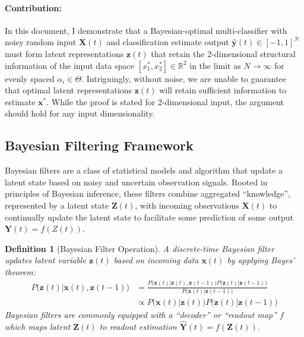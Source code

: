 \documentclass[12pt]{article}
\newtheorem{definition}{Definition}
\begin{document}
\paragraph{Contribution: } In this document, I demonstrate that a
Bayesian-optimal multi-classifier with noisy random input $\mathbf X(t)$ and
classification estimate output $\hat {\mathbf y}(t) \in [-1, 1]^N$ must form
latent representations $\mathbf z(t)$ that retain the 2-dimensional structural
information of the input data space $[x_1^*, x_2^*] \in \mathbb R^2$ in the
limit as $N\to \infty$ for evenly spaced $\alpha_i \in \Theta$. 
Intriguingly, without noise, we are unable to guarantee that optimal latent
representations $\mathbf z(t)$ will retain sufficient information to estimate
$\mathbf x^*$. 
While the proof is stated for 2-dimensional input, the argument should hold for
any input dimensionality. 



\subsection{Bayesian Filtering Framework}

Bayesian filters are a class of statistical models and algorithm that update a
latent state based on noisy and uncertain observation signals. 
Rooted in principles of Bayesian inference, these filters combine aggregated 
``knowledge'', represented by a latent state $\mathbf Z(t)$, with incoming
observations $\mathbf X(t)$ to continually update the latent state to
facilitate some prediction of some output $\mathbf Y(t) = f(Z(t))$. 


\begin{definition}[Bayesian Filter Operation]
	\label{def:bayesian_filter}
	A discrete-time Bayesian filter updates latent variable $\mathbf z(t)$
	based on incoming data $\mathbf x(t)$ by applying Bayes' theorem: 
	\begin{align}
		\label{eqn:bayes_filter}
		P \big(\mathbf z(t) | \mathbf  x(t), \mathbf z(t-1)\big) &= \frac{
			P\big(\mathbf x(t) | \mathbf z(t), \mathbf z(t-1)\big) 
			P\big(\mathbf z(t) | \mathbf z(t-1)\big)
		}{
			P\big(\mathbf x(t) | \mathbf z(t-1)\big)
		} \\
		&\propto P\big(\mathbf x(t) | \mathbf z(t) \big) 
			P\big(\mathbf z(t) | \mathbf z(t-1)\big)
	\end{align}
	Bayesian filters are commonly equipped with a ``decoder'' or ``readout
	map'' $f$ which maps latent $\mathbf Z(t)$ to readout estimation
	$\hat{\mathbf Y}(t) = f(\mathbf Z(t))$.
\end{definition}
\end{document}
